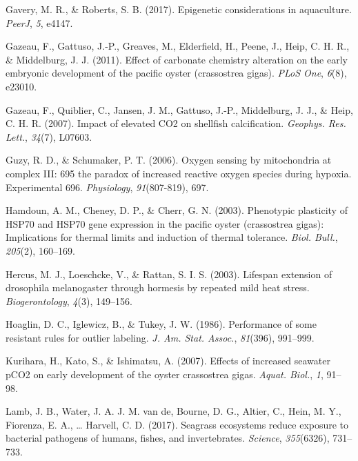 \documentclass [11pt, proquest] {uwthesis}[2015/03/03]
\newlength{\cslhangindent}
\newenvironment{CSLReferences}%
{\setlength{\parindent}{0pt}%
\everypar{\setlength{\hangindent}{\cslhangindent}}\ignorespaces}%
{\par}
\begin{document}
\begin{CSLReferences}{1}{0}
\leavevmode\hypertarget{ref-Gavery2017}{}%
Gavery, M. R., \& Roberts, S. B. (2017). Epigenetic considerations in aquaculture. \emph{PeerJ}, \emph{5}, e4147.

\leavevmode\hypertarget{ref-Gazeau2011}{}%
Gazeau, F., Gattuso, J.-P., Greaves, M., Elderfield, H., Peene, J., Heip, C. H. R., \& Middelburg, J. J. (2011). Effect of carbonate chemistry alteration on the early embryonic development of the pacific oyster (crassostrea gigas). \emph{PLoS One}, \emph{6}(8), e23010.

\leavevmode\hypertarget{ref-Gazeau2007}{}%
Gazeau, F., Quiblier, C., Jansen, J. M., Gattuso, J.-P., Middelburg, J. J., \& Heip, C. H. R. (2007). Impact of elevated {CO2} on shellfish calcification. \emph{Geophys. Res. Lett.}, \emph{34}(7), L07603.

\leavevmode\hypertarget{ref-Guzy2006}{}%
Guzy, R. D., \& Schumaker, P. T. (2006). Oxygen sensing by mitochondria at complex {III}: 695 the paradox of increased reactive oxygen species during hypoxia. Experimental 696. \emph{Physiology}, \emph{91}(807-819), 697.

\leavevmode\hypertarget{ref-Hamdoun2003}{}%
Hamdoun, A. M., Cheney, D. P., \& Cherr, G. N. (2003). Phenotypic plasticity of {HSP70} and {HSP70} gene expression in the pacific oyster (crassostrea gigas): Implications for thermal limits and induction of thermal tolerance. \emph{Biol. Bull.}, \emph{205}(2), 160--169.

\leavevmode\hypertarget{ref-Hercus2003}{}%
Hercus, M. J., Loeschcke, V., \& Rattan, S. I. S. (2003). Lifespan extension of drosophila melanogaster through hormesis by repeated mild heat stress. \emph{Biogerontology}, \emph{4}(3), 149--156.

\leavevmode\hypertarget{ref-Hoaglin1986}{}%
Hoaglin, D. C., Iglewicz, B., \& Tukey, J. W. (1986). Performance of some resistant rules for outlier labeling. \emph{J. Am. Stat. Assoc.}, \emph{81}(396), 991--999.

\leavevmode\hypertarget{ref-Kurihara2007}{}%
Kurihara, H., Kato, S., \& Ishimatsu, A. (2007). Effects of increased seawater {pCO2} on early development of the oyster crassostrea gigas. \emph{Aquat. Biol.}, \emph{1}, 91--98.

\leavevmode\hypertarget{ref-Lamb2017}{}%
Lamb, J. B., Water, J. A. J. M. van de, Bourne, D. G., Altier, C., Hein, M. Y., Fiorenza, E. A., \ldots{} Harvell, C. D. (2017). Seagrass ecosystems reduce exposure to bacterial pathogens of humans, fishes, and invertebrates. \emph{Science}, \emph{355}(6326), 731--733.


\end{CSLReferences}
\end{document}
